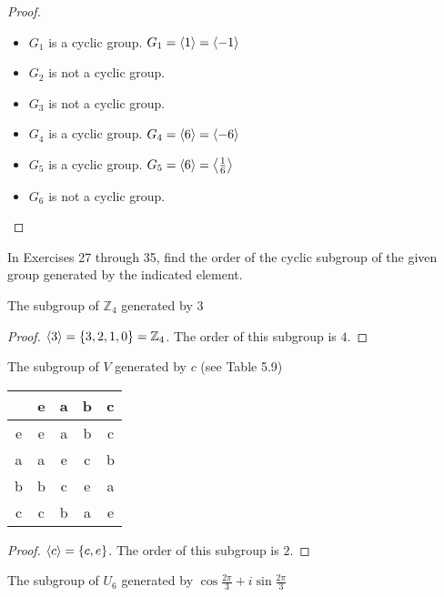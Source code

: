 \begin{proof}
    \begin{itemize}
        \item $G_{1}$ is a cyclic group. $G_{1} = \left\langle{1}\right\rangle = \left\langle{-1}\right\rangle$
        \item $G_{2}$ is not a cyclic group.
        \item $G_{3}$ is not a cyclic group.
        \item $G_{4}$ is a cyclic group. $G_{4} = \left\langle{6}\right\rangle = \left\langle{-6}\right\rangle$
        \item $G_{5}$ is a cyclic group. $G_{5} = \left\langle{6}\right\rangle = \left\langle{\frac{1}{6}}\right\rangle$
        \item $G_{6}$ is not a cyclic group.
    \end{itemize}
\end{proof}

In Exercises 27 through 35, find the order of the cyclic subgroup of the given group generated by the indicated element.

\begin{exercise}
    The subgroup of $\mathbb{Z}_{4}$ generated by $3$
\end{exercise}

\begin{proof}
    $\left\langle{3}\right\rangle = \{ 3, 2, 1, 0 \} = \mathbb{Z}_{4}$. The order of this subgroup is $4$.
\end{proof}

\begin{exercise}
    The subgroup of $V$ generated by $c$ (see Table 5.9)
    \begin{tabular}{c|cccc}
          & e & a & b & c \\
        \hline
        e & e & a & b & c \\
        a & a & e & c & b \\
        b & b & c & e & a \\
        c & c & b & a & e
    \end{tabular}
\end{exercise}

\begin{proof}
    $\left\langle{c}\right\rangle = \{ c, e \}$. The order of this subgroup is $2$.
\end{proof}

\begin{exercise}
    The subgroup of $U_{6}$ generated by $\cos\frac{2\pi}{3} + i\sin\frac{2\pi}{3}$
\end{exercise}


